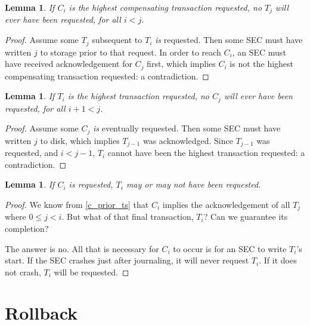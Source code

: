 \documentclass{article}
\newtheorem{lemma}[theorem]{Lemma}
\begin{document}
\begin{lemma}
\label{max_c_later_ts}
If $C_i$ is the highest compensating transaction requested, no $T_j$ will ever
have been requested, for all $i < j$.
\end{lemma}

\begin{proof}

Assume some $T_j$ subsequent to $T_i$ \textit{is} requested. Then some SEC must
have written $j$ to storage prior to that request. In order to reach $C_i$, an SEC must have received acknowledgement for $C_j$ first, which implies $C_i$ is not the highest compensating transaction requested: a contradiction.

\end{proof}

\begin{lemma}
\label{max_c_later_cs}
If $T_i$ is the highest transaction requested, no $C_j$ will ever have been
requested, for all $i + 1 < j$.
\end{lemma}

\begin{proof}

Assume some $C_j$ \textit{is} eventually requested. Then some SEC must have written $j$ to disk, which implies $T_{j-1}$ was acknowledged. Since $T_{j-1}$ was requested, and $i < j - 1$, $T_i$ cannot have been the highest transaction requested: a contradiction.

\end{proof}

\begin{lemma}
\label{c_maybe_t}
If $C_i$ is requested, $T_i$ may or may not have been requested.
\end{lemma}

\begin{proof}

We know from \ref{c_prior_ts} that $C_i$ implies the acknowledgement of all
$T_j$ where $0 \le j < i$. But what of that final transaction, $T_i$? Can we
guarantee its completion?

The answer is no. All that is necessary for $C_i$ to occur is for an SEC to
write $T_i$'s start. If the SEC crashes just after journaling, it will never
request $T_i$. If it does not crash, $T_i$ will be requested.

\end{proof}


\section{Rollback}
\end{document}
